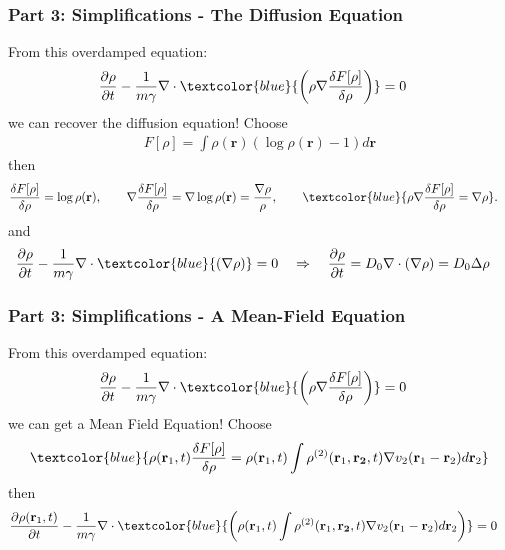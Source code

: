 \documentclass[aspectratio=169,xcolor=dvipsnames]{beamer}
\begin{document}
\begin{frame}
	\frametitle{Part 3: Simplifications - The Diffusion Equation}
	From this overdamped equation:
	\begin{align*}
	&\frac{\partial \rho}{\partial t} -\frac{1}{m \gamma}  \nabla \cdot \textcolor{blue}{\left(\rho \nabla \frac{\delta {F}[\rho]}{\delta \rho}\right)} = 0 
	\end{align*}
	we can recover the diffusion equation! Choose
\begin{align*}
{F}[\rho] =  \int \rho(\mathbf{r}) (\log\rho(\mathbf{r}) -1)d \mathbf{r}
\end{align*}
then
\begin{align*}
\frac{\delta {F}[\rho]}{\delta \rho} &= \log \rho(\mathbf{r}), \qquad
\nabla \frac{\delta {F}[\rho]}{\delta \rho} = \nabla \log \rho(\mathbf{r}) = \frac{\nabla \rho}{\rho}, \qquad
\textcolor{blue}{\rho \nabla \frac{\delta {F}[\rho]}{\delta \rho} = \nabla \rho}. 
\end{align*}
and
\begin{align*}
&\frac{\partial \rho}{\partial t} -\frac{1}{m \gamma}  \nabla \cdot \textcolor{blue}{\left(\nabla \rho\right)} = 0  \quad \Rightarrow \quad \frac{\partial \rho}{\partial t} = D_0 \nabla \cdot \left(\nabla \rho\right)  = D_0 \Delta \rho
\end{align*}
	
\end{frame}
\begin{frame}
	\frametitle{Part 3: Simplifications - A Mean-Field Equation}
	From this overdamped equation:
	\begin{align*}
	&\frac{\partial \rho}{\partial t} -\frac{1}{m \gamma}  \nabla \cdot \textcolor{blue}{\left(\rho \nabla \frac{\delta {F}[\rho]}{\delta \rho}\right)} = 0 
	\end{align*}
	we can get a Mean Field Equation! Choose
	\begin{align*}
	\textcolor{blue}{\rho(\mathbf{r}_1,t) \frac{\delta {F}[\rho]}{\delta \rho}  = \rho(\mathbf{r}_1,t) \int \rho^{(2)}(\mathbf{r}_1, \mathbf{r_2},t) \nabla v_2(\mathbf{r}_1 - \mathbf{r}_2) d\mathbf{r}_2}
	\end{align*}
	then
	\begin{align*}
	&\frac{\partial \rho(\mathbf{r}_1,t)}{\partial t} -\frac{1}{m \gamma}  \nabla \cdot {\textcolor{blue}{\left( \rho(\mathbf{r}_1,t)  \int \rho^{(2)}(\mathbf{r}_1, \mathbf{r_2},t) \nabla v_2(\mathbf{r}_1 - \mathbf{r}_2) d\mathbf{r}_2\right)}} = 0  
	\end{align*}
	
\end{frame}
\end{document}
